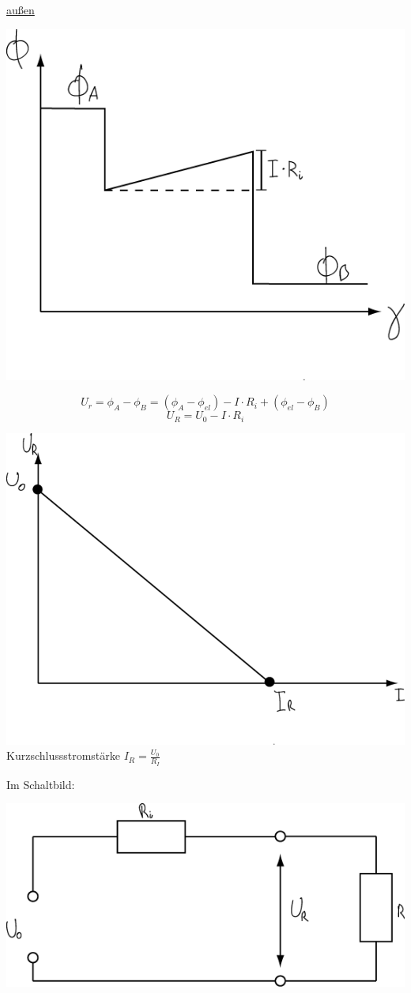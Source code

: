 \underline{außen}

\begin{center}
	\includegraphics[width=0.5\linewidth]{skizzen/15/15_6/15_6B6}
\end{center}

$$ U_r = \phi_A-\phi_B = (\phi_A - \phi_{el}) - I \cdot R_i + (\phi_{el}-\phi_B) $$
$$ \boxed{U_R = U_0 - I \cdot R_i} $$

\begin{center}
	\includegraphics[width=0.5\linewidth]{skizzen/15/15_6/15_6B7}\\
	Kurzschlussstromstärke $ I_R = \frac{U_0}{R_I} $
\end{center}

Im Schaltbild:

\begin{center}
\includegraphics[width=0.6\linewidth]{skizzen/15/15_6/15_6B8}
\end{center}
